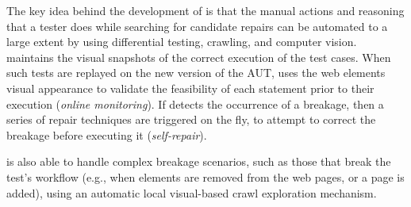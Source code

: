 

The key idea behind the development of \tool is that the manual actions and reasoning that a tester does while searching for candidate repairs can be automated to a large extent by using differential testing, crawling, and computer vision. 
\tool maintains the visual snapshots of the correct execution of the test cases. When such tests are replayed on the new version of the AUT, \tool uses the web elements visual appearance to validate the feasibility of each statement prior to their execution (\textit{online monitoring}). If \tool detects the occurrence of a breakage, then a series of repair techniques are triggered on the fly, to attempt to correct the breakage before executing it (\textit{self-repair}).

\tool is also able to handle complex breakage scenarios, such as those that break the test's workflow (e.g., when elements are removed from the web pages, or a page is added), using an automatic local visual-based crawl exploration mechanism.


